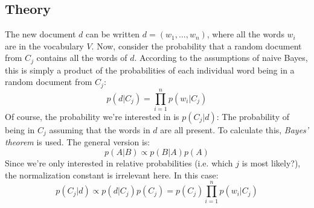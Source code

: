 \documentclass[12pt, a4paper]{article}
\numberwithin{equation}{section}
\begin{document}
\subsection{Theory}
The new document $d$ can be written $d=(w_1,\ldots,w_n)$, where all the words $w_i$ are in the vocabulary $V$. Now, consider the probability that a random document from $C_j$ contains all the words of $d$. According to the assumptions of naive Bayes, this is simply a product of the probabilities of each individual word being in a random document from $C_j$:
\begin{equation}
p(d|C_j)=\prod_{i=1}^n p(w_i|C_j)
\end{equation}
Of course, the probability we're interested in is $p(C_j|d)$: The probability of being in $C_j$ assuming that the words in $d$ are all present. To calculate this, \textit{Bayes' theorem} is used. The general version is:
\begin{equation}
p(A|B)\propto p(B|A)p(A)
\end{equation}
Since we're only interested in relative probabilities (i.e. which $j$ is most likely?), the normalization constant is irrelevant here. In this case:
\begin{equation}
p(C_j|d)\propto p(d|C_j)p(C_j)=p(C_j)\prod_{i=1}^n p(w_i|C_j)
\end{equation}
\end{document}
